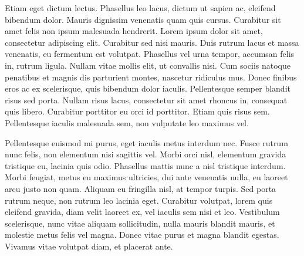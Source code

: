 \documentclass{article}
\begin{document}
 

Etiam eget dictum lectus.
 Phasellus leo lacus, dictum ut sapien ac, eleifend bibendum dolor.
 Mauris dignissim venenatis quam quis cursus.
 Curabitur sit amet felis non ipsum malesuada hendrerit.
 Lorem ipsum dolor sit amet, consectetur adipiscing elit.
 Curabitur sed nisi mauris.
 Duis rutrum lacus et massa venenatis, eu fermentum est volutpat.
 Phasellus vel urna tempor, accumsan felis in, rutrum ligula.
 Nullam vitae mollis elit, ut convallis nisi.
 Cum sociis natoque penatibus et magnis dis parturient montes, nascetur ridiculus mus.
 Donec finibus eros ac ex scelerisque, quis bibendum dolor iaculis.
 Pellentesque semper blandit risus sed porta.
 Nullam risus lacus, consectetur sit amet rhoncus in, consequat quis libero.
 Curabitur porttitor eu orci id porttitor.
 Etiam quis risus sem.
 Pellentesque iaculis malesuada sem, non vulputate leo maximus vel.

 

Pellentesque euismod mi purus, eget iaculis metus interdum nec.
 Fusce rutrum nunc felis, non elementum nisi sagittis vel.
 Morbi orci nisl, elementum gravida tristique eu, lacinia quis odio.
 Phasellus mattis nunc a nisl tristique interdum.
 Morbi feugiat, metus eu maximus ultricies, dui ante venenatis nulla, eu laoreet arcu justo non quam.
 Aliquam eu fringilla nisl, at tempor turpis.
 Sed porta rutrum neque, non rutrum leo lacinia eget.
 Curabitur volutpat, lorem quis eleifend gravida, diam velit laoreet ex, vel iaculis sem nisi et leo.
 Vestibulum scelerisque, nunc vitae aliquam sollicitudin, nulla mauris blandit mauris, et molestie metus felis vel magna.
 Donec vitae purus et magna blandit egestas.
 Vivamus vitae volutpat diam, et placerat ante.

 


\endnumbering
\end{document}
